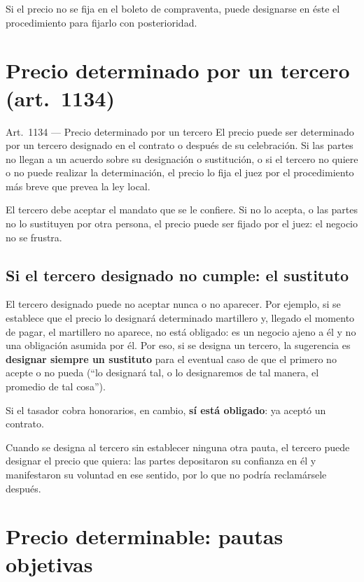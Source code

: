 \documentclass[12pt,oneside]{book}
\begin{document}
Si el precio no se fija en el boleto de compraventa, puede designarse en \'este el procedimiento para fijarlo con posterioridad.

\section{Precio determinado por un tercero (art.~1134)}

\begin{norma}{Art.~1134 --- Precio determinado por un tercero}
El precio puede ser determinado por un tercero designado en el contrato o despu\'es de su celebraci\'on. Si las partes no llegan a un acuerdo sobre su designaci\'on o sustituci\'on, o si el tercero no quiere o no puede realizar la determinaci\'on, el precio lo fija el juez por el procedimiento m\'as breve que prevea la ley local.
\end{norma}

El tercero debe aceptar el mandato que se le confiere. Si no lo acepta, o las partes no lo sustituyen por otra persona, el precio puede ser fijado por el juez: el negocio no se frustra.

\subsection{Si el tercero designado no cumple: el sustituto}

El tercero designado puede no aceptar nunca o no aparecer. Por ejemplo, si se establece que el precio lo designar\'a determinado martillero y, llegado el momento de pagar, el martillero no aparece, no est\'a obligado: es un negocio ajeno a \'el y no una obligaci\'on asumida por \'el. Por eso, si se designa un tercero, la sugerencia es \textbf{designar siempre un sustituto} para el eventual caso de que el primero no acepte o no pueda (``lo designar\'a tal, o lo designaremos de tal manera, el promedio de tal cosa'').

Si el tasador cobra honorarios, en cambio, \textbf{s\'i est\'a obligado}: ya acept\'o un contrato.

Cuando se designa al tercero sin establecer ninguna otra pauta, el tercero puede designar el precio que quiera: las partes depositaron su confianza en \'el y manifestaron su voluntad en ese sentido, por lo que no podr\'ia reclam\'arsele despu\'es.

\section{Precio determinable: pautas objetivas}
\end{document}

